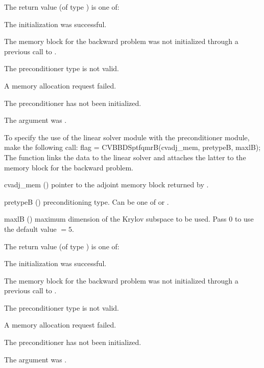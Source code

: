 {
  The return value  (of type ) is one of:
  \begin{args}
  \item[\Id{CVSPBCG\_SUCCESS}] 
    The {\cvspbcg} initialization was successful.
  \item[\Id{CVSPBCG\_MEM\_NULL}]
    The {\cvodes} memory block for the backward problem was not initialized through a 
    previous call to .
  \item[\Id{CVSPBCG\_ILL\_INPUT}]
    The preconditioner type  is not valid.
  \item[\Id{CVSPBCG\_MEM\_FAIL}]
    A memory allocation request failed.
  \item[\Id{CVBBDPRE\_PDATA\_NULL}]
    The {\cvbbdpre} preconditioner has not been initialized.
  \item[\Id{CVBBDPRE\_ADJMEM\_NULL}]
    The  argument was .
  \end{args}
}
{}
To specify the use of the {\cvsptfqmr} linear solver module with the {\cvbbdpre} 
preconditioner module, make the following call:
{
  flag = CVBBDSptfqmrB(cvadj\_mem, pretypeB, maxlB);
}
{
  The function  links the {\cvbbdpre} data to the
  {\cvsptfqmr} linear solver and attaches the latter to the {\cvodes}
  memory block for the backward problem.
}
{
  \begin{args}
  \item[cvadj\_mem] ()
    pointer to the adjoint memory block returned by .
  \item[pretypeB] ()
    preconditioning type. Can be one of  or .
  \item[maxlB] ()
    maximum dimension of the Krylov subspace to be used. Pass $0$ to use the 
    default value $=5$.
  \end{args}
}
{
  The return value  (of type ) is one of:
  \begin{args}
  \item[\Id{CVSPTFQMR\_SUCCESS}] 
    The {\cvsptfqmr} initialization was successful.
  \item[\Id{CVSPTFQMR\_MEM\_NULL}]
    The {\cvodes} memory block for the backward problem was not initialized through a 
    previous call to .
  \item[\Id{CVSPTFQMR\_ILL\_INPUT}]
    The preconditioner type  is not valid.
  \item[\Id{CVSPTFQMR\_MEM\_FAIL}]
    A memory allocation request failed.
  \item[\Id{CVBBDPRE\_PDATA\_NULL}]
    The {\cvbbdpre} preconditioner has not been initialized.
  \item[\Id{CVBBDPRE\_ADJMEM\_NULL}]
    The  argument was .
  \end{args}
}
